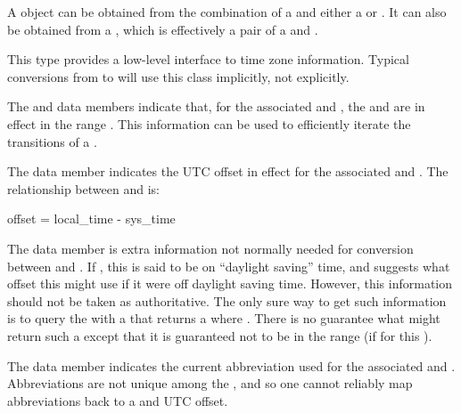 \pnum
A  object can be obtained
from the combination of a  and
either a  or .
It can also be obtained from a ,
which is effectively a pair of a  and .

\pnum
\begin{note}
This type provides a low-level interface to time zone information.
Typical conversions from  to 
will use this class implicitly, not explicitly.
\end{note}

\pnum
{}%
%
The  and  data members indicate that,
for the associated  and ,
the  and  are in effect in the range .
This information can be used to efficiently iterate the transitions of a .

\pnum
{}%
The  data member indicates
the UTC offset in effect
for the associated  and .
The relationship between  and  is:

\begin{codeblock}
offset = local_time - sys_time
\end{codeblock}

\pnum
{}%
The  data member is extra information not normally needed
for conversion between  and .
If , this  is said to be on ``daylight saving'' time,
and  suggests what offset this  might use
if it were off daylight saving time.
However, this information should not be taken as authoritative.
The only sure way to get such information
is to query the  with a 
that returns a  where .
There is no guarantee what  might return such a 
except that it is guaranteed not to be in the range 
(if  for this ).

\pnum
{}%
The  data member indicates
the current abbreviation used for the associated  and .
Abbreviations are not unique among the ,
and so one cannot reliably map abbreviations back to a  and UTC offset.


